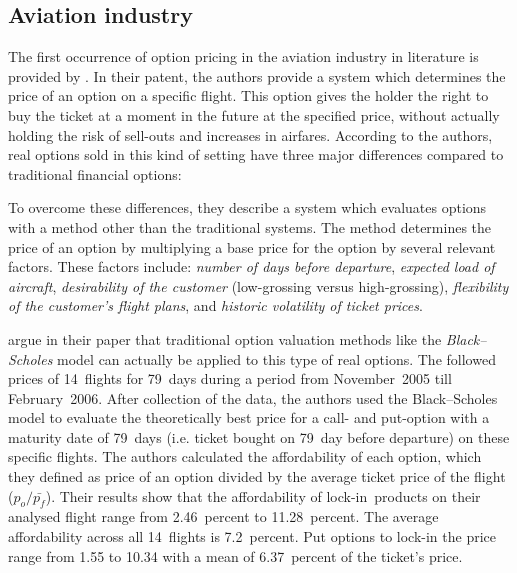 \subsection{Aviation industry}
\label{subsec:AviationIndustry}
The first occurrence of option pricing in the aviation industry in literature is provided by . In their patent, the authors provide a system which determines the price of an option on a specific flight. This option gives the holder the right to buy the ticket at a moment in the future at the specified price, without actually holding the risk of sell-outs and increases in airfares. According to the authors, real options sold in this kind of setting have three major differences compared to traditional financial options:

To overcome these differences, they describe a system which evaluates options with a method other than the traditional systems. The method determines the price of an option by multiplying a base price for the option by several relevant factors. These factors include: \emph{number of days before departure}, \emph{expected load of aircraft}, \emph{desirability of the customer} (low-grossing versus high-grossing), \emph{flexibility of the customer's flight plans}, and \emph{historic volatility of ticket prices}.

 argue in their paper that traditional option valuation methods like the \emph{Black--Scholes} model \cite{black1976pricing} can actually be applied to this type of real options. The followed prices of 14~flights for 79~days during a period from November~2005 till February~2006. After collection of the data, the authors used the Black--Scholes model to evaluate the theoretically best price for a call- and put-option with a maturity date of 79~days (i.e. ticket bought on 79~day before departure) on these specific flights. The authors calculated the affordability of each option, which they defined as price of an option divided by the average ticket price of the flight ($p_o/\bar{p_f}$). Their results show that the affordability of lock-in~products on their analysed flight range from 2.46~percent to 11.28~percent. The average affordability across all 14~flights is 7.2~percent. Put options to lock-in the price range from 1.55 to 10.34 with a mean of 6.37~percent of the ticket's price.

